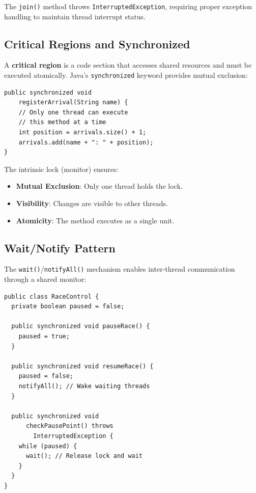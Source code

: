 \documentclass[10pt,a4paper,twocolumn]{article}
\begin{document}
\begin{note}
The \texttt{join()} method throws \texttt{InterruptedException}, requiring proper exception handling to maintain thread interrupt status.
\end{note}

\subsection{Critical Regions and Synchronized}

A \textbf{critical region} is a code section that accesses shared resources and must be executed atomically. Java's \texttt{synchronized} keyword provides mutual exclusion:

\begin{lstlisting}[caption={Synchronized Method}]
public synchronized void
    registerArrival(String name) {
    // Only one thread can execute
    // this method at a time
    int position = arrivals.size() + 1;
    arrivals.add(name + ": " + position);
}
\end{lstlisting}

The intrinsic lock (monitor) ensures:
\begin{itemize}
    \item \textbf{Mutual Exclusion}: Only one thread holds the lock.
    \item \textbf{Visibility}: Changes are visible to other threads.
    \item \textbf{Atomicity}: The method executes as a single unit.
\end{itemize}

\subsection{Wait/Notify Pattern}

The \texttt{wait()}/\texttt{notifyAll()} mechanism enables inter-thread communication through a shared monitor:

\begin{lstlisting}[caption={Monitor Pattern}]
public class RaceControl {
  private boolean paused = false;
  
  public synchronized void pauseRace() {
    paused = true;
  }
  
  public synchronized void resumeRace() {
    paused = false;
    notifyAll(); // Wake waiting threads
  }
  
  public synchronized void 
      checkPausePoint() throws
        InterruptedException {
    while (paused) {
      wait(); // Release lock and wait
    }
  }
}
\end{lstlisting}
\end{document}
